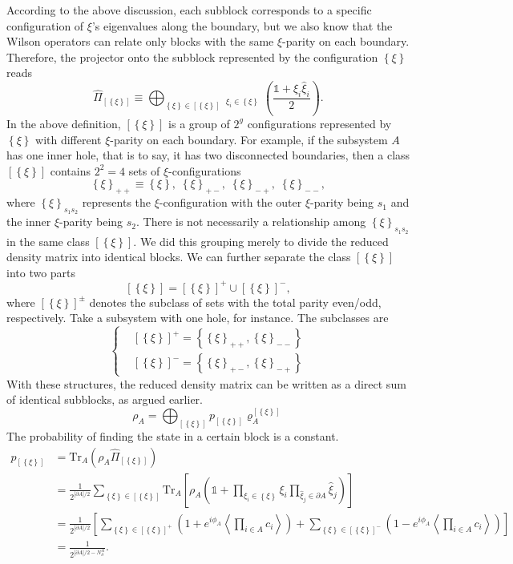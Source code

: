 \documentclass[12font]{article}
\theoremstyle{definition}
\newcommand{\Anglelr}[1]{\left\langle #1 \right\rangle}
\newcommand{\lr}[1]{\left(  #1  \right)}
\newcommand{\lrm}[1]{\left[  #1  \right]}
\newcommand{\lrg}[1]{\left\{  #1  \right\}}
\newcommand{\abs}[1]{\left|  #1  \right|}
\newcommand{\de}{\partial}
\newcommand{\mrm}[1]{\mathrm{#1}}
\newcommand{\Tr}{\mrm{Tr}}
\begin{document}
According to the above discussion, each subblock corresponds to a specific configuration of $\xi$'s eigenvalues along the boundary, but we also know that the Wilson operators can relate only blocks with the same $\xi$-parity on each boundary. Therefore, the projector onto the subblock represented by the configuration $\lrg{\xi}$ reads 
\begin{equation}
    \hat{\Pi}_{[\lrg{\xi}]} 
    \equiv 
    \bigoplus_{\lrg{\xi}\in [\lrg{\xi}]} 
    \mathop{\prod_{\hat{\xi}_i\in\de A}}_{\xi_i\in\lrg{\xi}}
    \lr{\frac{\mathds{1} + \xi_i\hat{\xi}_i}{2}}.
\end{equation}
In the above definition, $[\lrg{\xi}]$ is a group of $2^g$ configurations represented by $\lrg{\xi}$ with different $\xi$-parity on each boundary. For example, if the subsystem $A$ has one inner hole, that is to say, it has two disconnected boundaries, then a class $[\lrg{\xi}]$ contains $2^2 = 4$ sets of $\xi$-configurations 
\[
\lrg{\xi}_{++}\equiv\lrg{\xi}, \; \lrg{\xi}_{+-}, \; \lrg{\xi}_{-+},\; \lrg{\xi}_{--},
\]
where $\lrg{\xi}_{s_1s_2}$ represents the $\xi$-configuration with the outer $\xi$-parity being $s_1$ and the inner $\xi$-parity being $s_2$. There is not necessarily a relationship among $\lrg{\xi}_{s_1s_2}$ in the same class $[\lrg{\xi}]$. We did this grouping merely to divide the reduced density matrix into identical blocks. We can further separate the class $[\lrg{\xi}]$ into two parts 
\[
[\lrg{\xi}] = [\lrg{\xi}]^+ \cup [\lrg{\xi}]^-,
\]
where $[\lrg{\xi}]^\pm$ denotes the subclass of sets with the total parity even/odd, respectively. Take a subsystem with one hole, for instance. The subclasses are
\[
\left\{
\begin{aligned}
    & [\lrg{\xi}]^+ = \lrg{\lrg{\xi}_{++}, \lrg{\xi}_{--}} \\
    & [\lrg{\xi}]^- = \lrg{\lrg{\xi}_{+-}, \lrg{\xi}_{-+}}
\end{aligned}
\right.
\]
With these structures, the reduced density matrix can be written as a direct sum of identical subblocks, as argued earlier.
\begin{equation}
    \rho_A = \bigoplus_{[\lrg{\xi}]} p_{[\lrg{\xi}]} \varrho_A^{[\lrg{\xi}]}
\end{equation}
The probability of finding the state in a certain block is a constant.
\begin{align*}
    p_{[\lrg{\xi}]} 
    &= 
    \Tr_A\lr{\rho_A \hat{\Pi}_{[\lrg{\xi}]}} \\
    &=
    \frac{1}{2^{\abs{\de A}/2}}
    \sum_{\lrg{\xi}\in[\lrg{\xi}]}
    \Tr_A\lrm{
        \rho_A
        \lr{
        \mathds{1}
        +
        \prod_{\xi_i\in\lrg{\xi}}\xi_i \prod_{\hat{\xi}_j\in\de A}\hat{\xi}_j
        }
    } \\
    &=
    \frac{1}{2^{\abs{\de A}/2}}
    \lrm{
        \sum_{\lrg{\xi}\in[\lrg{\xi}]^+}
        \lr{1 + e^{i\phi_A}\Anglelr{\prod_{i\in A}c_i}}
        +
        \sum_{\lrg{\xi}\in[\lrg{\xi}]^-}
        \lr{1 - e^{i\phi_A}\Anglelr{\prod_{i\in A}c_i}}
    } \\
    &=
    \frac{1}{2^{\abs{\de A}/2 - N^A_\de}}.
\end{align*}
\end{document}
